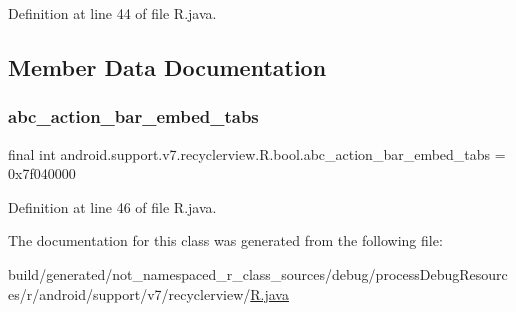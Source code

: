 Definition at line 44 of file R.\+java.


\begin{DoxyCode}{0}

\end{DoxyCode}


\subsection{Member Data Documentation}
\mbox{\label{classandroid_1_1support_1_1v7_1_1recyclerview_1_1_r_1_1bool_a09daaf77c51bf57b0e10b5634f08e2c6}} 
\subsubsection{\texorpdfstring{abc\_action\_bar\_embed\_tabs}{abc\_action\_bar\_embed\_tabs}}
{\footnotesize\ttfamily final int android.\+support.\+v7.\+recyclerview.\+R.\+bool.\+abc\+\_\+action\+\_\+bar\+\_\+embed\+\_\+tabs = 0x7f040000\hspace{0.3cm}{\ttfamily [static]}}



Definition at line 46 of file R.\+java.



The documentation for this class was generated from the following file\+:\begin{DoxyCompactItemize}
\item 
build/generated/not\+\_\+namespaced\+\_\+r\+\_\+class\+\_\+sources/debug/process\+Debug\+Resources/r/android/support/v7/recyclerview/\mbox{\hyperlink{android_2support_2v7_2recyclerview_2_r_8java}{R.\+java}}\end{DoxyCompactItemize}
